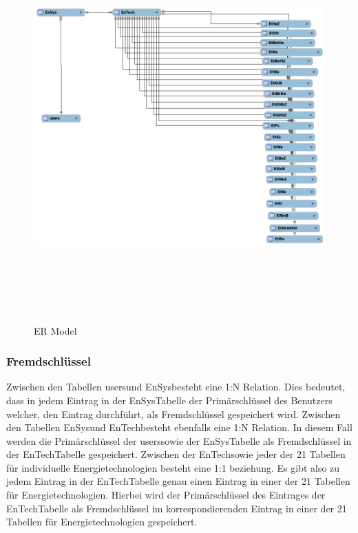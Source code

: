 \begin{figure}[h]
	\centering
	\includegraphics[height=15cm,width=18cm]{images/eer}
	\caption{ER Model}
	\label{fig:ERModel}
\end{figure}
\newpage
\subsubsection{Fremdschlüssel}
 Zwischen den Tabellen \glqq users\grqq \space und \glqq EnSys\grqq \space besteht eine 1:N Relation. Dies bedeutet, dass in jedem Eintrag in der \glqq EnSys\grqq \space Tabelle der Primärschlüssel des Benutzers welcher, den Eintrag durchführt, als Fremdschlüssel gespeichert wird. Zwischen den Tabellen \glqq EnSys\grqq \space und \glqq EnTech\grqq \space besteht ebenfalls eine 1:N Relation. In diesem Fall werden die Primärschlüssel der \glqq users\grqq \space sowie der \glqq EnSys\grqq \space Tabelle als Fremdschlüssel in der  \glqq EnTech\grqq \space Tabelle gespeichert. Zwischen der \glqq EnTech\grqq \space sowie jeder der 21 Tabellen für individuelle Energietechnologien besteht eine 1:1 beziehung. Es gibt also zu jedem Eintrag in der  \glqq EnTech\grqq \space Tabelle genau einen Eintrag in einer der 21 Tabellen für Energietechnologien. Hierbei wird der Primärschlüssel des Eintrages der \glqq EnTech\grqq \space Tabelle als Fremdschlüssel im korrespondierenden Eintrag in einer der 21 Tabellen für Energietechnologien gespeichert.



